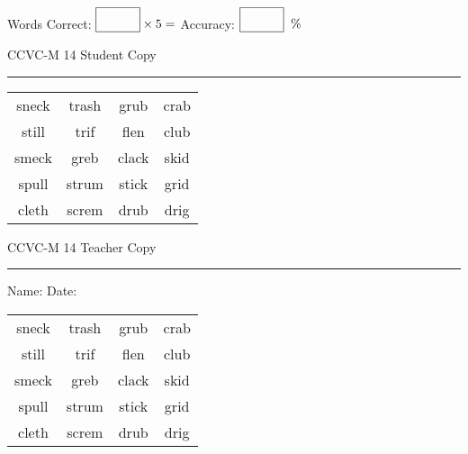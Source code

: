 \documentclass{memoir}
\begin{document}
\small

Words Correct: $\fbox{\phantom{\huge 100}} \times 5 = $ Accuracy: $\fbox{\phantom{\huge 100}}\;\; \%$ 

\vfill

\newpage


\footnotesize \noindent
CCVC-M 14 \hfill Student Copy
\smallskip
\hrule

\Large

\setlength{\tabcolsep}{14pt}
\def\arraystretch{3}

{\selectfont


\begin{vplace}[0.5]
\begin{center}
\begin{tabular}{cccc}
sneck & trash & grub & crab        \\
still & trif & flen & club \\
smeck & greb & clack             & skid \\
spull & strum & stick & grid \\
cleth & screm & drub             & drig        \\
\end{tabular}
\end{center}
\end{vplace}

}

\newpage

\footnotesize \noindent
CCVC-M 14 \hfill Teacher Copy
\smallskip
\hrule

\small

\vfill

\noindent
Name: \underline{\hspace{1.75in}} \hfill Date: \underline{\hspace{1in}}

\Large

{\selectfont


\begin{vplace}[0.5]
\begin{center}
\begin{tabular}{cccc}
sneck & trash & grub & crab        \\
still & trif & flen & club \\
smeck & greb & clack             & skid \\
spull & strum & stick & grid \\
cleth & screm & drub             & drig        \\
\end{tabular}
\end{center}
\end{vplace}



}
\end{document}
